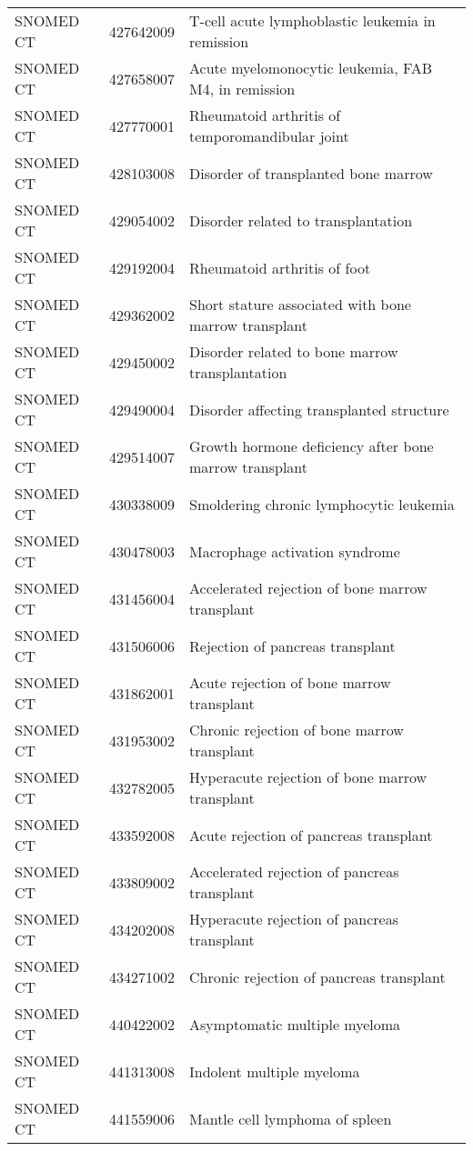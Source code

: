 \begin{table}[ht]
\begin{tabular}{lll}
  SNOMED CT & 427642009 & T-cell acute lymphoblastic leukemia in remission \\ 
  SNOMED CT & 427658007 & Acute myelomonocytic leukemia, FAB M4, in remission \\ 
  SNOMED CT & 427770001 & Rheumatoid arthritis of temporomandibular joint \\ 
  SNOMED CT & 428103008 & Disorder of transplanted bone marrow \\ 
  SNOMED CT & 429054002 & Disorder related to transplantation \\ 
  SNOMED CT & 429192004 & Rheumatoid arthritis of foot \\ 
  SNOMED CT & 429362002 & Short stature associated with bone marrow transplant \\ 
  SNOMED CT & 429450002 & Disorder related to bone marrow transplantation \\ 
  SNOMED CT & 429490004 & Disorder affecting transplanted structure \\ 
  SNOMED CT & 429514007 & Growth hormone deficiency after bone marrow transplant \\ 
  SNOMED CT & 430338009 & Smoldering chronic lymphocytic leukemia \\ 
  SNOMED CT & 430478003 & Macrophage activation syndrome \\ 
  SNOMED CT & 431456004 & Accelerated rejection of bone marrow transplant \\ 
  SNOMED CT & 431506006 & Rejection of pancreas transplant \\ 
  SNOMED CT & 431862001 & Acute rejection of bone marrow transplant \\ 
  SNOMED CT & 431953002 & Chronic rejection of bone marrow transplant \\ 
  SNOMED CT & 432782005 & Hyperacute rejection of bone marrow transplant \\ 
  SNOMED CT & 433592008 & Acute rejection of pancreas transplant \\ 
  SNOMED CT & 433809002 & Accelerated rejection of pancreas transplant \\ 
  SNOMED CT & 434202008 & Hyperacute rejection of pancreas transplant \\ 
  SNOMED CT & 434271002 & Chronic rejection of pancreas transplant \\ 
  SNOMED CT & 440422002 & Asymptomatic multiple myeloma \\ 
  SNOMED CT & 441313008 & Indolent multiple myeloma \\ 
  SNOMED CT & 441559006 & Mantle cell lymphoma of spleen \\ 

\end{tabular}
\end{table}

